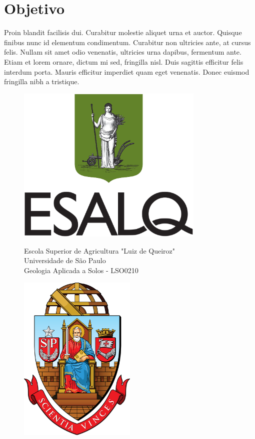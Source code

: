 \documentclass{article}
\begin{document}
	\section{Objetivo}
	
	
	Proin blandit facilisis dui. Curabitur molestie aliquet urna et auctor. Quisque finibus nunc id elementum condimentum. Curabitur non ultricies ante, at cursus felis. Nullam sit amet odio venenatis, ultricies urna dapibus, fermentum ante. Etiam et lorem ornare, dictum mi sed, fringilla nisl. Duis sagittis efficitur felis interdum porta. Mauris efficitur imperdiet quam eget venenatis. Donec euismod fringilla nibh a tristique.
	
	\begin{figure}[!ht]
		\centering
		
		\begin{minipage}{0.2\textwidth}
			\centering
			\includegraphics[width=0.8\textwidth]{Figuras/brasao_esalq1.jpg} 
		\end{minipage}\hfill
		\begin{minipage}{0.5\textwidth}
			\centering
			Escola Superior de Agricultura "Luiz de Queiroz"\\ 
			Universidade de São Paulo\\
			Geologia Aplicada a Solos - LSO0210\\
		\end{minipage}\hfill
		\begin{minipage}{0.2\textwidth}
			\centering
			\includegraphics[width=0.5\textwidth]{Figuras/brasao_usp1.png}

\end{minipage}
\end{figure}
\end{document}
